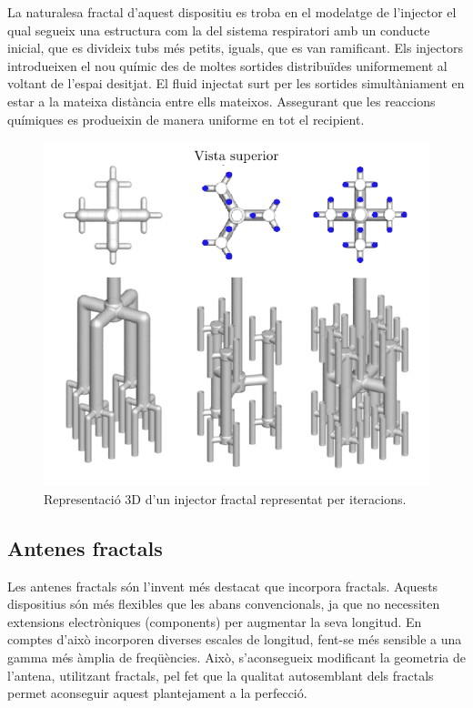 \documentclass[12pt,a4paper]{report}
\begin{document}
La naturalesa fractal d'aquest dispositiu es troba en el modelatge de l'injector el qual segueix una estructura com la del sistema respiratori amb un conducte inicial, que es divideix tubs més petits, iguals, que es van ramificant. Els injectors  introdueixen el nou químic des de moltes sortides distribuïdes uniformement al voltant de l'espai desitjat. El fluid injectat surt per les sortides simultàniament en estar a la mateixa distància entre ells mateixos. Assegurant que les reaccions químiques es produeixin de manera uniforme en tot el recipient.
\begin{figure}[!ht]
\centering
\includegraphics[scale=1]{img/img05_injector.pdf}
\caption{Representació 3D d'un injector fractal representat per iteracions.}
\end{figure}
\newpage
\subsection{Antenes fractals}
Les antenes fractals són l'invent més destacat que incorpora fractals. Aquests dispositius són més flexibles que les abans convencionals, ja que no necessiten extensions electròniques (components) per augmentar la seva longitud. En comptes d'això incorporen diverses escales de longitud, fent-se més sensible a una gamma més àmplia de freqüències. Això, s'aconsegueix modificant la geometria de l'antena, utilitzant fractals, pel fet que la qualitat autosemblant dels fractals permet aconseguir aquest plantejament a la perfecció.
\end{document}
